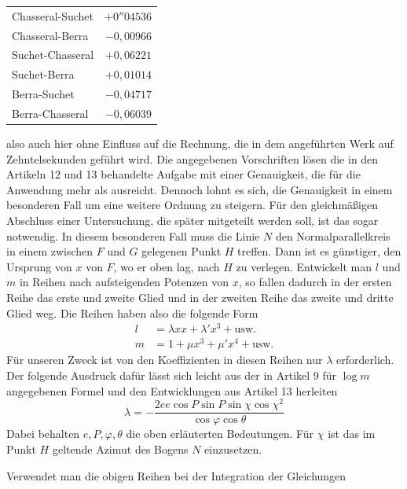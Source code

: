 %
\begin{center}
\begin{tabular}{lr}
Chasseral-Suchet&\(+0''04536\)\\
Chasseral-Berra&\(-0{,}00966\)\\
Suchet-Chasseral&\(+0{,}06221\)\\
Suchet-Berra&\(+0{,}01014\)\\
Berra-Suchet&\(-0{,}04717\)\\
Berra-Chasseral&\(-0{,}06039\)
\end{tabular}
\end{center}
also auch hier ohne Einfluss auf die Rechnung, die in dem angeführten Werk auf Zehntelsekunden geführt wird.
Die angegebenen Vorschriften lösen die in den Artikeln 12 und 13 behandelte Aufgabe mit einer Genauigkeit, die für die Anwendung mehr als ausreicht. Dennoch lohnt es sich, die Genauigkeit in einem besonderen Fall um eine weitere Ordnung zu steigern. Für den gleichmäßigen Abschluss einer Untersuchung, die später mitgeteilt werden soll, ist das sogar notwendig. In diesem besonderen Fall muss die Linie \(N\) den Normalparallelkreis in einem zwischen \(F\) und \(G\) gelegenen Punkt \(H\) treffen. Dann ist es günstiger, den Ursprung von \(x\) von \(F\), wo er oben lag, nach \(H\) zu verlegen. Entwickelt man \(l\) und \(m\) in Reihen nach aufsteigenden Potenzen von \(x\), so fallen dadurch in der ersten Reihe das erste und zweite Glied und in der zweiten Reihe das zweite und dritte Glied weg. Die Reihen haben also die folgende Form
\[
\begin{aligned}
l&=\lambda xx+\lambda'x^3+\text{usw.}\\
m&=1+\mu x^3+\mu'x^4+\text{usw.}
\end{aligned}
\]
\indent Für unseren Zweck ist von den Koeffizienten in diesen Reihen nur \(\lambda\) erforderlich. Der folgende Ausdruck dafür lässt sich leicht aus der in Artikel 9 für \(\log m\) angegebenen Formel und den Entwicklungen aus Artikel 13 herleiten
\[
\lambda=-\frac{2ee\cos P\sin P\sin\chi\cos\chi^2}{\cos\varphi\cos\theta}
\]
Dabei behalten \(e,P,\varphi,\theta\) die oben erläuterten Bedeutungen. Für \(\chi\) ist das im Punkt \(H\) geltende Azimut des Bogens \(N\) einzusetzen.

Verwendet man die obigen Reihen bei der Integration der Gleichungen
